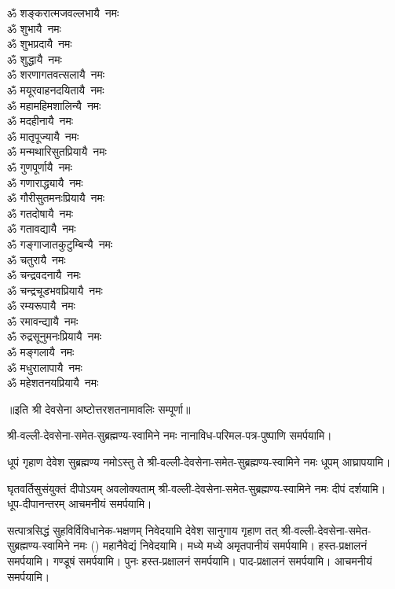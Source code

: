 \begin{flushleft}
\begin{multicols}{2}
ॐ शङ्करात्मजवल्लभायै~नमः\\
ॐ शुभायै~नमः\\
ॐ शुभप्रदायै~नमः\\
ॐ शुद्धायै~नमः\\
ॐ शरणागतवत्सलायै~नमः\\
ॐ मयूरवाहनदयितायै~नमः\\
ॐ महामहिमशालिन्यै~नमः\hfill{}\\
ॐ मदहीनायै~नमः\\
ॐ मातृपूज्यायै~नमः\\
ॐ मन्मथारिसुतप्रियायै~नमः\\
ॐ गुणपूर्णायै~नमः\\
ॐ गणाराद्ध्यायै~नमः\\
ॐ गौरीसुतमनःप्रियायै~नमः\\
ॐ गतदोषायै~नमः\\
ॐ गतावद्यायै~नमः\\
ॐ गङ्गाजातकुटुम्बिन्यै~नमः\\
ॐ चतुरायै~नमः\hfill{}\\
ॐ चन्द्रवदनायै~नमः\\
ॐ चन्द्रचूडभवप्रियायै~नमः\\
ॐ रम्यरूपायै~नमः\\
ॐ रमावन्द्यायै~नमः\\
ॐ रुद्रसूनुमनःप्रियायै~नमः\\
ॐ मङ्गलायै~नमः\\
ॐ मधुरालापायै~नमः\\
ॐ महेशतनयप्रियायै~नमः\\
\end{multicols}
\end{flushleft}
॥इति श्री देवसेना अष्टोत्तरशतनामावलिः सम्पूर्णा॥




श्री-वल्ली-देवसेना-समेत-सुब्रह्मण्य-स्वामिने नमः नानाविध-परिमल-पत्र-पुष्पाणि समर्पयामि।


{धूपं गृहाण देवेश सुब्रह्मण्य नमोऽस्तु ते}
श्री-वल्ली-देवसेना-समेत-सुब्रह्मण्य-स्वामिने नमः धूपम् आघ्रापयामि।

{घृतवर्तिसुसंयुक्तं दीपोऽयम् अवलोक्यताम्}
श्री-वल्ली-देवसेना-समेत-सुब्रह्मण्य-स्वामिने नमः दीपं दर्शयामि। धूप-दीपानन्तरम् आचमनीयं समर्पयामि।

\twolineshloka
{सत्पात्रसिद्धं सुहविर्विविधानेक-भक्षणम्}
{निवेदयामि देवेश सानुगाय गृहाण तत्}
श्री-वल्ली-देवसेना-समेत-सुब्रह्मण्य-स्वामिने नमः () महानैवेद्यं निवेदयामि। 
मध्ये मध्ये अमृतपानीयं समर्पयामि। हस्त-प्रक्षालनं समर्पयामि। गण्डूषं समर्पयामि। पुनः हस्त-प्रक्षालनं समर्पयामि।
 पाद-प्रक्षालनं समर्पयामि। आचमनीयं समर्पयामि।

